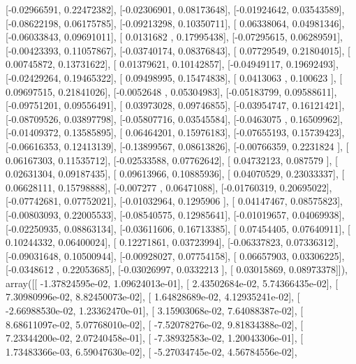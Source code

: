 \documentclass{article}
\begin{document}
       [-0.02966591,  0.22472382],
       [-0.02306901,  0.08173648],
       [-0.01924642,  0.03543589],
       [-0.08622198,  0.06175785],
       [-0.09213298,  0.10350711],
       [ 0.06338064,  0.04981346],
       [-0.06033843,  0.09691011],
       [ 0.0131682 ,  0.17995438],
       [-0.07295615,  0.06289591],
       [-0.00423393,  0.11057867],
       [-0.03740174,  0.08376843],
       [ 0.07729549,  0.21804015],
       [ 0.00745872,  0.13731622],
       [ 0.01379621,  0.10142857],
       [-0.04949117,  0.19692493],
       [-0.02429264,  0.19465322],
       [ 0.09498995,  0.15474838],
       [ 0.0413063 ,  0.100623  ],
       [ 0.09697515,  0.21841026],
       [-0.0052648 ,  0.05304983],
       [-0.05183799,  0.09588611],
       [-0.09751201,  0.09556491],
       [ 0.03973028,  0.09746855],
       [-0.03954747,  0.16121421],
       [-0.08709526,  0.03897798],
       [-0.05807716,  0.03545584],
       [-0.0463075 ,  0.16509962],
       [-0.01409372,  0.13585895],
       [ 0.06464201,  0.15976183],
       [-0.07655193,  0.15739423],
       [-0.06616353,  0.12413139],
       [-0.13899567,  0.08613826],
       [-0.00766359,  0.2231824 ],
       [ 0.06167303,  0.11535712],
       [-0.02533588,  0.07762642],
       [ 0.04732123,  0.087579  ],
       [ 0.02631304,  0.09187435],
       [ 0.09613966,  0.10885936],
       [ 0.04070529,  0.23033337],
       [ 0.06628111,  0.15798888],
       [-0.007277  ,  0.06471088],
       [-0.01760319,  0.20695022],
       [-0.07742681,  0.07752021],
       [-0.01032964,  0.1295906 ],
       [ 0.04147467,  0.08575823],
       [-0.00803093,  0.22005533],
       [-0.08540575,  0.12985641],
       [-0.01019657,  0.04069938],
       [-0.02250935,  0.08863134],
       [-0.03611606,  0.16713385],
       [ 0.07454405,  0.07640911],
       [ 0.10244332,  0.06400024],
       [ 0.12271861,  0.03723994],
       [-0.06337823,  0.07336312],
       [-0.09031648,  0.10500944],
       [-0.00928027,  0.07754158],
       [ 0.06657903,  0.03306225],
       [-0.0348612 ,  0.22053685],
       [-0.03026997,  0.0332213 ],
       [ 0.03015869,  0.08973378]]), array([[ -1.37824595e-02,   1.09624013e-01],
       [  2.43502684e-02,   5.74366435e-02],
       [  7.30980996e-02,   8.82450073e-02],
       [  1.64828689e-02,   4.12935241e-02],
       [ -2.66988530e-02,   1.23362470e-01],
       [  3.15903068e-02,   7.64088387e-02],
       [  8.68611097e-02,   5.07768010e-02],
       [ -7.52078276e-02,   9.81834388e-02],
       [  7.23344200e-02,   2.07240458e-01],
       [ -7.38932583e-02,   1.20043306e-01],
       [  1.73483366e-03,   6.59047630e-02],
       [ -5.27034745e-02,   4.56784556e-02],
\end{document}
